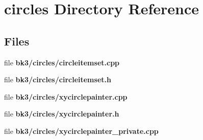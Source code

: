 \section{circles Directory Reference}
\label{dir_a4bafd72eb591dd377851bfb34017f5e}
\subsection*{Files}
\begin{DoxyCompactItemize}
\item 
file {\bf bk3/circles/circleitemset.\+cpp}
\item 
file {\bf bk3/circles/circleitemset.\+h}
\item 
file {\bf bk3/circles/xycirclepainter.\+cpp}
\item 
file {\bf bk3/circles/xycirclepainter.\+h}
\item 
file {\bf bk3/circles/xycirclepainter\+\_\+private.\+cpp}
\end{DoxyCompactItemize}
